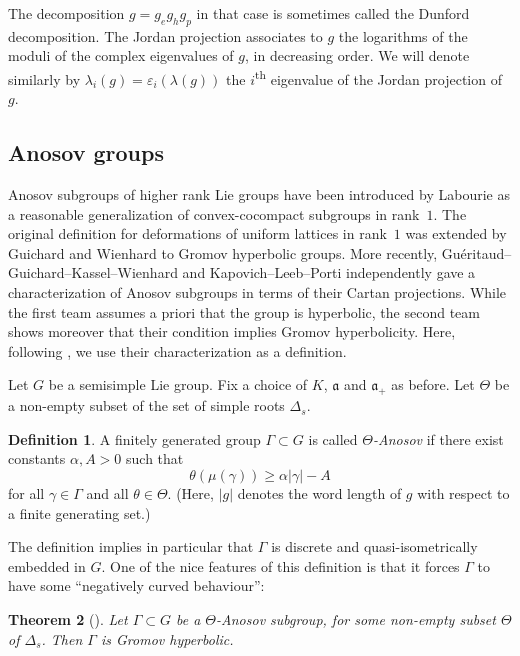 \documentclass[JEP,XML,SOM,Unicode,NoEqCountersInSection,NoFloatCountersInSection,published]{cedram}
\newtheorem{theo}{Theorem}[section]
\theoremstyle{definition}
\newtheorem{defi}[theo]{Definition}
\newcommand{\fa}{\mathfrak{a}}
\let\epsilon\varepsilon
\let\G\Gamma
\let\g\gamma
\begin{document}
The decomposition $g = g_e g_h g_p$ in that case is sometimes called the Dunford decomposition. The Jordan projection associates to $g$ the logarithms of the moduli of the complex eigenvalues of $g$, in decreasing order. We will denote similarly by $\lambda_i(g)= \epsilon_i(\lambda(g))$ the $i$\textsuperscript{th} eigenvalue of the Jordan projection of $g$.

\subsection{Anosov groups}\label{subsubsec-Anosov representation}

Anosov subgroups of higher rank Lie groups have been introduced by Labourie \cite{labourie2006anosov} as a reasonable generalization of convex-cocompact subgroups in rank~$1$. The original definition for deformations of uniform lattices in rank~$1$ was extended by Guichard and Wienhard to Gromov hyperbolic groups. More recently, Guéritaud--Guichard--Kassel--Wienhard \cite{gueritaud20017anosov} and Kapovich--Leeb--Porti \cite{kapovich2017anosov} independently gave a characterization of Anosov subgroups in terms of their Cartan projections. While the first team assumes a priori that the group is hyperbolic, the second team shows moreover that their condition implies Gromov hyperbolicity. Here, following \cite{Guichard}, we use their characterization as a definition.

Let $G$ be a semisimple Lie group. Fix a choice of $K$, $\fa$ and $\fa_+$ as before. Let $\Theta$ be a non-empty subset of the set of simple roots $\Delta_s$.

\begin{defi}
A finitely generated group $\G \subset G$ is called \emph{$\Theta$-Anosov} if there exist constants $\alpha, A>0$ such that
\[\theta(\mu(\g)) \geq \alpha \vert \g \vert - A \]
for all $\g\in \G$ and all $\theta \in \Theta$.
(Here, $\vert g \vert$ denotes the word length of $g$ with respect to a finite generating set.)
\end{defi}
The definition implies in particular that $\G$ is discrete and quasi-isometrically embedded in $G$. One of the nice features of this definition is that it forces $\Gamma$ to have some ``negatively curved behaviour'':

\begin{theo}[{\cite[Th.\,6.15]{kapovich2018anosov}}]
Let $\G \subset G$ be a $\Theta$-Anosov subgroup, for some non-empty subset $\Theta$ of $\Delta_s$. Then $\G$ is Gromov hyperbolic.
\end{theo}
\end{document}
